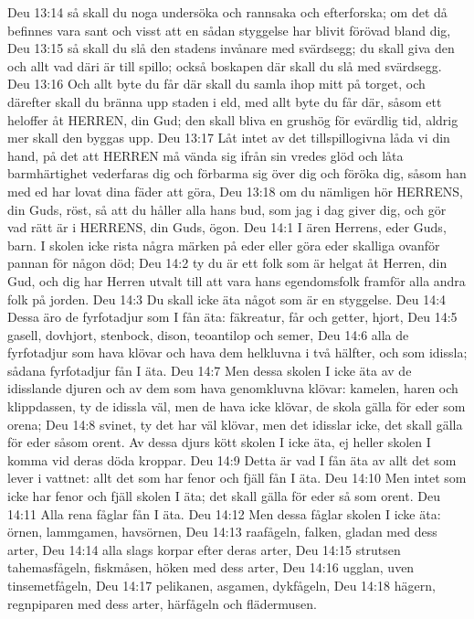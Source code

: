 Deu 13:14  så skall du noga undersöka och rannsaka och efterforska; om det då befinnes vara sant och visst att en sådan styggelse har blivit förövad bland dig,
Deu 13:15  så skall du slå den stadens invånare med svärdsegg; du skall giva den och allt vad däri är till spillo; också boskapen där skall du slå med svärdsegg.
Deu 13:16  Och allt byte du får där skall du samla ihop mitt på torget, och därefter skall du bränna upp staden i eld, med allt byte du får där, såsom ett heloffer åt HERREN, din Gud; den skall bliva en grushög för evärdlig tid, aldrig mer skall den byggas upp.
Deu 13:17  Låt intet av det tillspillogivna låda vi din hand, på det att HERREN må vända sig ifrån sin vredes glöd och låta barmhärtighet vederfaras dig och förbarma sig över dig och föröka dig, såsom han med ed har lovat dina fäder att göra,
Deu 13:18  om du nämligen hör HERRENS, din Guds, röst, så att du håller alla hans bud, som jag i dag giver dig, och gör vad rätt är i HERRENS, din Guds, ögon.
Deu 14:1  I ären Herrens, eder Guds, barn. I skolen icke rista några märken på eder eller göra eder skalliga ovanför pannan för någon död;
Deu 14:2  ty du är ett folk som är helgat åt Herren, din Gud, och dig har Herren utvalt till att vara hans egendomsfolk framför alla andra folk på jorden.
Deu 14:3  Du skall icke äta något som är en styggelse.
Deu 14:4  Dessa äro de fyrfotadjur som I fån äta: fäkreatur, får och getter, hjort,
Deu 14:5  gasell, dovhjort, stenbock, dison, teoantilop och semer,
Deu 14:6  alla de fyrfotadjur som hava klövar och hava dem helkluvna i två hälfter, och som idissla; sådana fyrfotadjur fån I äta.
Deu 14:7  Men dessa skolen I icke äta av de idisslande djuren och av dem som hava genomkluvna klövar: kamelen, haren och klippdassen, ty de idissla väl, men de hava icke klövar, de skola gälla för eder som orena;
Deu 14:8  svinet, ty det har väl klövar, men det idisslar icke, det skall gälla för eder såsom orent. Av dessa djurs kött skolen I icke äta, ej heller skolen I komma vid deras döda kroppar.
Deu 14:9  Detta är vad I fån äta av allt det som lever i vattnet: allt det som har fenor och fjäll fån I äta.
Deu 14:10  Men intet som icke har fenor och fjäll skolen I äta; det skall gälla för eder så som orent.
Deu 14:11  Alla rena fåglar fån I äta.
Deu 14:12  Men dessa fåglar skolen I icke äta: örnen, lammgamen, havsörnen,
Deu 14:13  raafågeln, falken, gladan med dess arter,
Deu 14:14  alla slags korpar efter deras arter,
Deu 14:15  strutsen tahemasfågeln, fiskmåsen, höken med dess arter,
Deu 14:16  ugglan, uven tinsemetfågeln,
Deu 14:17  pelikanen, asgamen, dykfågeln,
Deu 14:18  hägern, regnpiparen med dess arter, härfågeln och flädermusen.
